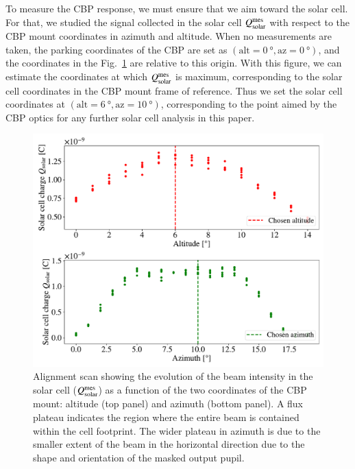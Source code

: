To measure the CBP response, we must ensure that we aim toward the solar cell. For that, we studied the signal collected in the solar cell $Q_{\mathrm{solar}}^{\mathrm{mes}}$ with respect to the CBP mount coordinates in azimuth and altitude. When no measurements are taken, the parking coordinates of the CBP are set as $(\mathrm{alt} = \SI{0}{\degree}, \mathrm{az} = \SI{0}{\degree})$, and the coordinates in the Fig.~\ref{fig:cross_sc} are relative to this origin. With this figure, we can estimate the coordinates at which $Q_{\mathrm{solar}}^{\mathrm{mes}}$ is maximum, corresponding to the solar cell coordinates in the CBP mount frame of reference. Thus we set the solar cell coordinates at $(\mathrm{alt} = \SI{6}{\degree}, \mathrm{az} = \SI{10}{\degree})$, corresponding to the point aimed by the CBP optics for any further solar cell analysis in this paper.

\begin{figure}%
    \centering
    \includegraphics[width=\columnwidth]{fig/cross_solarcell.pdf}
    \caption{Alignment scan showing the evolution of the beam
      intensity in the solar cell ($Q_{\mathrm{solar}}^{\mathrm{mes}}$) as a function of the
      two coordinates of the CBP mount: altitude (top panel) and
      azimuth (bottom panel). A flux plateau indicates the region
      where the entire beam is contained within the cell
      footprint. The wider plateau in azimuth is due to the smaller
      extent of the beam in the horizontal direction due to the shape
      and orientation of the masked output pupil.  }
    \label{fig:cross_sc}
\end{figure}


